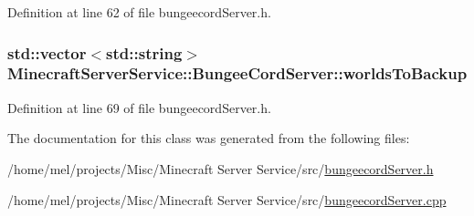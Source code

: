Definition at line 62 of file bungeecord\+Server.\+h.

\subsubsection[{\texorpdfstring{worlds\+To\+Backup}{worldsToBackup}}]{\setlength{\rightskip}{0pt plus 5cm}std\+::vector$<$std\+::string$>$ Minecraft\+Server\+Service\+::\+Bungee\+Cord\+Server\+::worlds\+To\+Backup\hspace{0.3cm}{\ttfamily [protected]}}\hypertarget{class_minecraft_server_service_1_1_bungee_cord_server_a9cdff082e45d4ef5ffc6c4fd7143e8b7}{}\label{class_minecraft_server_service_1_1_bungee_cord_server_a9cdff082e45d4ef5ffc6c4fd7143e8b7}


Definition at line 69 of file bungeecord\+Server.\+h.



The documentation for this class was generated from the following files\+:\begin{DoxyCompactItemize}
\item 
/home/mel/projects/\+Misc/\+Minecraft Server Service/src/\hyperlink{bungeecord_server_8h}{bungeecord\+Server.\+h}\item 
/home/mel/projects/\+Misc/\+Minecraft Server Service/src/\hyperlink{bungeecord_server_8cpp}{bungeecord\+Server.\+cpp}\end{DoxyCompactItemize}
